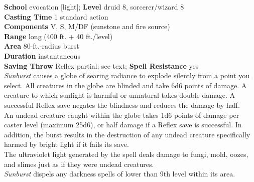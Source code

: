 \textbf{School} evocation [light]; \textbf{Level} druid 8, sorcerer/wizard 8\\
\textbf{Casting Time} 1 standard action\\
\textbf{Components} V, S, M/DF (sunstone and fire source)\\
\textbf{Range} long (400 ft. + 40 ft./level)\\
\textbf{Area} 80-ft.-radius burst\\
\textbf{Duration} instantaneous\\
\textbf{Saving Throw} Reflex partial; see text; \textbf{Spell Resistance} yes\\
\textit{Sunburst }causes a globe of searing radiance to explode silently from a point you select. All creatures in the globe are blinded and take 6d6 points of damage. A creature to which sunlight is harmful or unnatural takes double damage. A successful Reflex save negates the blindness and reduces the damage by half.\\
An undead creature caught within the globe takes 1d6 points of damage per caster level (maximum 25d6), or half damage if a Reflex save is successful. In addition, the burst results in the destruction of any undead creature specifically harmed by bright light if it fails its save.\\
The ultraviolet light generated by the spell deals damage to fungi, mold, oozes, and slimes just as if they were undead creatures.\\
\textit{Sunburst }dispels any darkness spells of lower than 9th level within its area.\\
